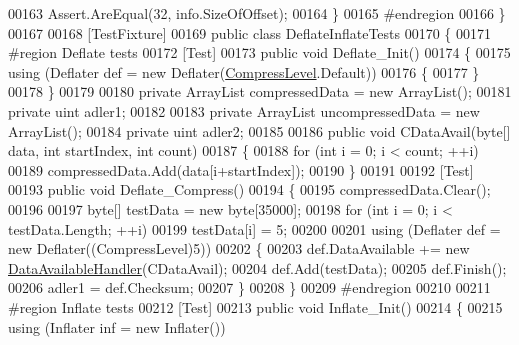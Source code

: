 \begin{DoxyCode}
00163             Assert.AreEqual(32, info.SizeOfOffset);
00164         \}
00165 \textcolor{preprocessor}{        #endregion}
00166     \}
00167 
00168     [TestFixture]
00169     \textcolor{keyword}{public} \textcolor{keyword}{class }DeflateInflateTests
00170     \{
00171 \textcolor{preprocessor}{        #region Deflate tests}
00172         [Test]
00173         \textcolor{keyword}{public} \textcolor{keywordtype}{void} Deflate\_Init()
00174         \{
00175             \textcolor{keyword}{using} (Deflater def = \textcolor{keyword}{new} Deflater(\hyperlink{namespace_dot_z_lib_a034f7a1ef9856d8834e6f6b1c53d8a4c}{CompressLevel}.Default))
00176             \{
00177             \}
00178         \}
00179 
00180         \textcolor{keyword}{private} ArrayList compressedData = \textcolor{keyword}{new} ArrayList();
00181         \textcolor{keyword}{private} uint adler1;
00182 
00183         \textcolor{keyword}{private} ArrayList uncompressedData = \textcolor{keyword}{new} ArrayList();
00184         \textcolor{keyword}{private} uint adler2;
00185 
00186         \textcolor{keyword}{public} \textcolor{keywordtype}{void} CDataAvail(byte[] data, \textcolor{keywordtype}{int} startIndex, \textcolor{keywordtype}{int} count)
00187         \{
00188             \textcolor{keywordflow}{for} (\textcolor{keywordtype}{int} i = 0; i < count; ++i)
00189                 compressedData.Add(data[i+startIndex]);
00190         \}
00191 
00192         [Test]
00193         \textcolor{keyword}{public} \textcolor{keywordtype}{void} Deflate\_Compress()
00194         \{
00195             compressedData.Clear();
00196 
00197             byte[] testData = \textcolor{keyword}{new} byte[35000];
00198             \textcolor{keywordflow}{for} (\textcolor{keywordtype}{int} i = 0; i < testData.Length; ++i)
00199                 testData[i] = 5;
00200 
00201             \textcolor{keyword}{using} (Deflater def = \textcolor{keyword}{new} Deflater((CompressLevel)5))
00202             \{
00203                 def.DataAvailable += \textcolor{keyword}{new} \hyperlink{namespace_dot_z_lib_a13a751b897fc2af0be2307e4deb7eb1c}{DataAvailableHandler}(CDataAvail);
00204                 def.Add(testData);
00205                 def.Finish();
00206                 adler1 = def.Checksum;
00207             \}
00208         \}
00209 \textcolor{preprocessor}{        #endregion}
00210 
00211 \textcolor{preprocessor}{        #region Inflate tests}
00212         [Test]
00213         \textcolor{keyword}{public} \textcolor{keywordtype}{void} Inflate\_Init()
00214         \{
00215             \textcolor{keyword}{using} (Inflater inf = \textcolor{keyword}{new} Inflater())

\end{DoxyCode}
